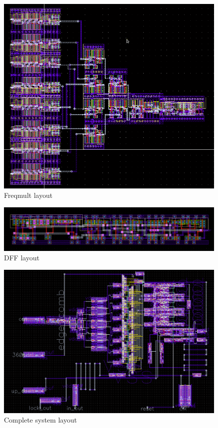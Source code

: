 \documentclass[a4paper,12pt]{article} \usepackage{graphicx}
\begin{document}
\begin{figure}[h]
  \centering
  \includegraphics[width=1.0\textwidth]{../Bilder/Layout/freq_mult_tpl.png}
  \caption{Freqmult layout}
  \label{fig:freq_mult_final}
\end{figure}

\begin{figure}[h]
  \centering
  \includegraphics[width=1.0\textwidth]{../Bilder/Layout/dff_sync_reset_qbar_clkset.png}
  \caption{DFF layout}
  \label{fig:dff_final}
\end{figure}

\begin{figure}[h]
  \centering
  \includegraphics[width=1.0\textwidth]{../Bilder/Layout/complete_system.png}
  \caption{Complete system layout}
  \label{fig:complete_system_final}
\end{figure}
\end{document}

